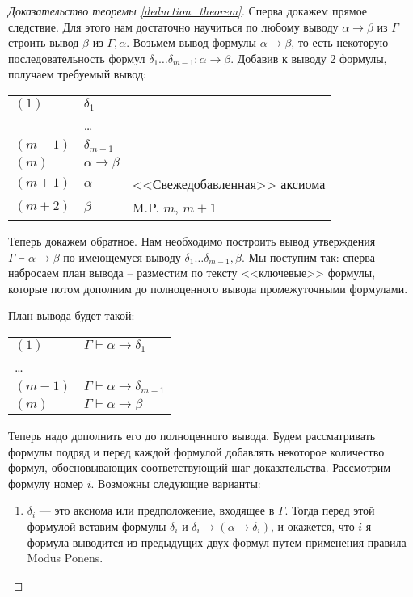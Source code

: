 \begin{proof}[Доказательство теоремы \ref{deduction_theorem}]

Сперва докажем прямое следствие. Для этого нам 
достаточно научиться по любому выводу $\alpha \rightarrow \beta$ из $\Gamma$ строить 
вывод $\beta$ из $\Gamma, \alpha$. Возьмем вывод 
формулы $\alpha \rightarrow \beta$, то есть некоторую последовательность 
формул $\delta_1 \dots \delta_{m-1}; \alpha \rightarrow \beta$.
Добавив к выводу 2 формулы, получаем требуемый вывод:

\vspace{0.2cm}
\begin{tabular}{lll}
$(1)$ & $\delta_1$\\
& \dots\\
$(m-1)$ & $\delta_{m-1}$\\
$(m)$ & $\alpha \rightarrow \beta$\\
$(m+1)$ & $\alpha$ & <<Свежедобавленная>> аксиома \\
$(m+2)$ & $\beta$ & M.P. $m$, $m+1$\\
\end{tabular}
\vspace{0.2cm}

Теперь докажем обратное. Нам необходимо построить вывод утверждения 
$\Gamma \vdash \alpha \rightarrow \beta$ по имеющемуся выводу 
$\delta_1 \dots \delta_{m-1}, \beta$.
Мы поступим так: сперва набросаем план вывода -- разместим по тексту 
<<ключевые>> формулы, которые потом дополним до полноценного вывода 
промежуточными формулами. 

План вывода будет такой:

\begin{tabular}{ll}
$(1)$ & $\Gamma \vdash \alpha \rightarrow \delta_1$\\
\dots\\
$(m-1)$ & $\Gamma \vdash \alpha \rightarrow \delta_{m-1}$\\
$(m)$ & $\Gamma \vdash \alpha \rightarrow \beta$
\end{tabular}

Теперь надо дополнить его до полноценного вывода. Будем рассматривать
формулы подряд и перед каждой формулой добавлять некоторое количество
формул, обосновывающих соответствующий шаг доказательства. 
Рассмотрим формулу номер $i$. Возможны следующие варианты:

\begin{enumerate}
\item $\delta_i$ --- это аксиома или предположение, входящее в $\Gamma$. 
Тогда перед этой формулой вставим 
формулы $\delta_i$ и $\delta_i \rightarrow (\alpha \rightarrow \delta_i)$, 
и окажется, что $i$-я формула выводится из предыдущих двух формул
путем применения правила Modus Ponens.


\end{enumerate}
\end{proof}

